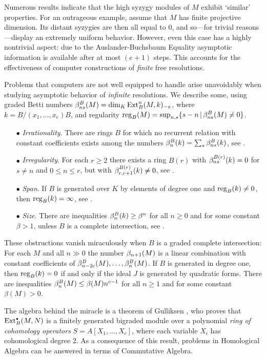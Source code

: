 Numerous results indicate that the high syzygy modules of $M$ exhibit
`similar' properties.  For an outrageous example, assume that $M$ has
finite projective dimension.  Its distant syzygies are then all equal
to $0$, and so---for trivial reasons---display an extremely uniform
behavior.  However, even this case has a highly nontrivial aspect: due
to the Auslander-Buchsbaum Equality asymptotic information is available
after at most $(e+1)$ steps.  This accounts for the effectiveness of
computer constructions of {\it finite\/} free resolutions.

Problems that computers are not well equipped to handle arise
unavoidably when studying asymptotic behavior of {\it infinite\/}
resolutions.  We describe some, using graded Betti numbers
$\beta^B_{ns}(M)=\dim_K\operatorname{Ext}^n_B(M,k)_{-s}$, where $k=B/(x_1,\dots,x_e)B$,
and regularity ${\operatorname{reg}}_B(M)= \sup_{n,s}\{s-n\,|\, \beta^B_{ns}(M)\ne0\}$.
\begin{itemize}
\item[$\bullet$]
{\it Irrationality\/}.
There are rings $B$ for which no recurrent relation with constant
coefficients exists among the numbers $\beta^B_n(k)=\sum_{s}\beta^B_{ns}(k)$,
see \cite{CI:MR86i:55011a}.
\item[$\bullet$]
{\it Irregularity\/}.
For each $r\ge2$ there exists a ring $B(r)$ with $\beta^{B(r)}_{ns}(k)=0$
for $s\ne n$ and $0\le n\le r$, but with $\beta^{B(r)}_{r,r+1}(k)\ne0$,
see \cite{CI:MR94b:16040}.
\item[$\bullet$]
{\it Span\/}.
If $B$ is generated over $K$ by elements of degree one and ${\operatorname{reg}}_B(k)
\ne0$, then ${\operatorname{reg}}_B(k) =\infty$, see \cite{CI:AP}.
\item[$\bullet$]
{\it Size\/}.
There are inequalities $\beta^B_n(k)\ge\beta^n$ for all $n\ge0$ and for
some constant $\beta>1$, unless $B$ is a complete intersection, see
\cite{CI:res}.
 \end{itemize}

These obstructions vanish miraculously when $B$ is a graded complete
intersection:  For each $M$ and all $n\gg0$ the number $\beta_{n+1}(M)$ is
a linear combination with constant coefficients of $\beta^B_{n-2c}(M),
\dots,\beta^B_{n}(M)$. If $B$ is generated in degree one, then
${\operatorname{reg}}_B(k)=0$ if and only if the ideal $J$ is generated by quadratic
forms.  There are inequalities $\beta^B_n(M)\le\beta(M)n^{c-1}$ for all
$n\ge1$ and for some constant $\beta(M)>0$.

The algebra behind the miracle is a theorem of Gulliksen
\cite{CI:MR51:487}, who proves that $\operatorname{Ext}^{\scriptscriptstyle\bullet}_B(M,N)$ is a finitely
generated bigraded module over a polynomial {\it ring of cohomology
operators\/} $S=A[X_1,\dots,X_c]$, where each variable $X_i$ has
cohomological degree $2$.  As a consequence of this result, problems in
Homological Algebra can be answered in terms of Commutative Algebra.

